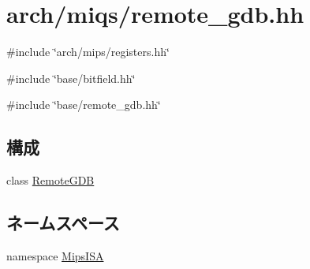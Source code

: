 \hypertarget{arch_2miqs_2remote__gdb_8hh}{
\section{arch/miqs/remote\_\-gdb.hh}
\label{arch_2miqs_2remote__gdb_8hh}
}
{\ttfamily \#include \char`\"{}arch/mips/registers.hh\char`\"{}}\par
{\ttfamily \#include \char`\"{}base/bitfield.hh\char`\"{}}\par
{\ttfamily \#include \char`\"{}base/remote\_\-gdb.hh\char`\"{}}\par
\subsection*{構成}
\begin{DoxyCompactItemize}
\item 
class \hyperlink{classMipsISA_1_1RemoteGDB}{RemoteGDB}
\end{DoxyCompactItemize}
\subsection*{ネームスペース}
\begin{DoxyCompactItemize}
\item 
namespace \hyperlink{namespaceMipsISA}{MipsISA}
\end{DoxyCompactItemize}
